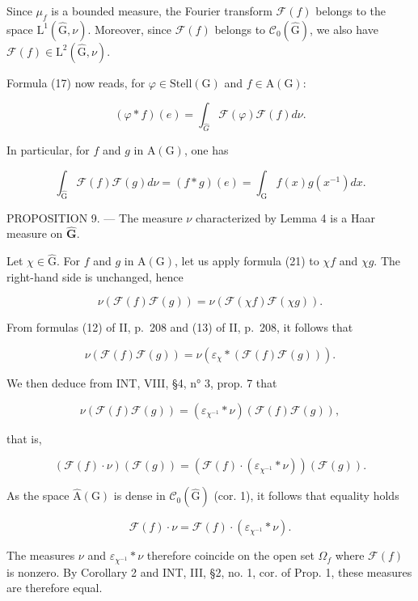 Since \(\mu_f\) is a bounded measure, the Fourier transform \(\mathcal{F}(f)\) belongs to the space \(\mathrm{L}^1 (\widehat{\mathrm{G}},\nu)\). Moreover, since \(\mathcal{F}(f)\) belongs to \(\mathcal{C}_0(\widehat{\mathrm{G}})\), we also have \(\mathcal{F}(f)\in \mathrm{L}^2 (\widehat{\mathrm{G}},\nu)\).

Formula (17) now reads, for \(\varphi\in\mathrm{Stell}(\mathrm{G})\) and \(f\in\mathrm{A}(\mathrm{G})\):

\[
(\varphi * f) (e) = \int_ {\widehat {G}} \mathcal {F} (\varphi) \mathcal {F} (f) d \nu .\tag{20}
\]

In particular, for \(f\) and \(g\) in \(\mathrm{A}(\mathrm{G})\), one has

\[
\int_ {\widehat {\mathrm{G}}} \mathcal {F} (f) \mathcal {F} (g) d \nu = (f * g) (e) = \int_ {\mathrm{G}} f (x) g (x ^ {- 1}) d x.\tag{21}
\]

PROPOSITION 9. — The measure \(\nu\) characterized by Lemma 4 is a Haar measure on \(\widehat{\mathbf{G}}\).

Let \(\chi \in \widehat{\mathrm{G}}\). For \(f\) and \(g\) in \(\mathrm{A}(\mathrm{G})\), let us apply formula (21) to \(\chi f\) and \(\chi g\). The right-hand side is unchanged, hence

\[
\nu (\mathcal {F} (f) \mathcal {F} (g)) = \nu (\mathcal {F} (\chi f) \mathcal {F} (\chi g)).
\]

From formulas (12) of II, p.~208 and (13) of II, p.~208, it follows that

\[
\nu (\mathcal {F} (f) \mathcal {F} (g)) = \nu (\varepsilon_ {\chi} * (\mathcal {F} (f) \mathcal {F} (g))).
\]

We then deduce from INT, VIII, §4, n° 3, prop. 7 that

\[
\nu (\mathcal {F} (f) \mathcal {F} (g)) = (\varepsilon_ {\chi^ {- 1}} * \nu) (\mathcal {F} (f) \mathcal {F} (g)),
\]

that is,

\[
(\mathscr {F} (f) \cdot \nu) (\mathscr {F} (g)) = (\mathscr {F} (f) \cdot (\varepsilon_ {\chi^ {- 1}} * \nu)) (\mathscr {F} (g)).
\]

As the space \(\widehat{\mathrm{A}}(\mathrm{G})\) is dense in \(\mathcal{C}_{0}(\widehat{\mathrm{G}})\) (cor. 1), it follows that equality holds

\[
\mathscr {F} (f) \cdot \nu = \mathscr {F} (f) \cdot (\varepsilon_ {\chi^ {- 1}} * \nu).
\]

The measures \(\nu\) and \(\varepsilon_{\chi^{-1}} * \nu\) therefore coincide on the open set \(\Omega_f\) where \(\mathcal{F}(f)\) is nonzero. By Corollary 2 and INT, III, §2, no. 1, cor. of Prop. 1, these measures are therefore equal.


